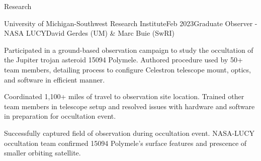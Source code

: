 \documentclass{resume} %
\begin{document}
\begin{rSection}{Research}


\begin{rSubsection}{University of Michigan-Southwest Research Institute}{Feb 2023}{Graduate Observer - NASA LUCY}{David Gerdes (UM) \& Marc Buie (SwRI)}
    \item Participated in a ground-based observation campaign to study the occultation of the Jupiter trojan asteroid 15094 Polymele. Authored procedure used by 50+ team members, detailing process to configure Celestron telescope mount, optics, and software in efficient manner.
    \item Coordinated 1,100+ miles of travel to observation site location. Trained other team members in telescope setup and resolved issues with hardware and software in preparation for occultation event.
    \item Successfully captured field of observation during occultation event. NASA-LUCY occultation team confirmed 15094 Polymele's surface features and prescence of smaller orbiting satellite.
\end{rSubsection}


\end{rSection}
\end{document}

